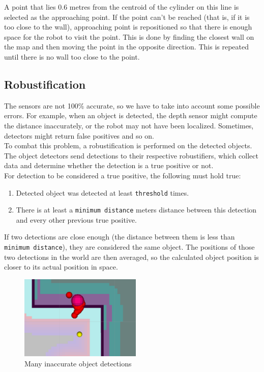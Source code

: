 \documentclass[12pt,a4paper]{article}
\begin{document}
	A point that lies 0.6 metres from the centroid of the cylinder on this line is selected as the approaching point. If the point can't be reached (that is, if it is too close to the wall), approaching point is repositioned so that there is enough space for the robot to visit the point. This is done by finding the closest wall on the map and then moving the point in the opposite direction. This is repeated until there is no wall too close to the point. \\
	
	\subsection{Robustification} \label{robustification}
	The sensors are not 100\% accurate, so we have to take into account some possible errors. For example, when an object is detected, the depth sensor might compute the distance inaccurately, or the robot may not have been localized. Sometimes, detectors might return false positives and so on. \\
	
	To combat this problem, a robustification is performed on the detected objects. The object detectors send detections to their respective robustifiers, which collect data and determine whether the detection is a true positive or not. \\
	
	For detection to be considered a true positive, the following must hold true:
	\begin{enumerate}
		\item Detected object was detected at least \texttt{threshold} times.
		\item There is at least a \texttt{minimum distance} meters distance between this detection and every other previous true positive.
	\end{enumerate}

	If two detections are close enough (the distance between them is less than \texttt{minimum distance}), they are considered the same object. The positions of those two detections in the world are then averaged, so the calculated object position is closer to its actual position in space. \\
	
	\begin{figure}[h]
		\centering
		\includegraphics[height=4cm]{images/detections}
		\caption{Many inaccurate object detections}
		\label{fig:inaccurate_detections}
	\end{figure}
\end{document}
